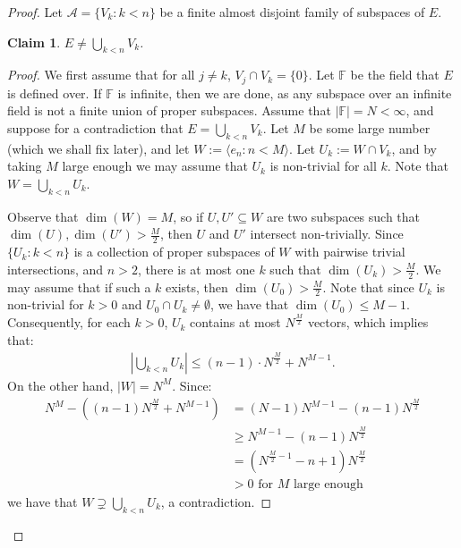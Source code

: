 \documentclass[10pt,a4paper]{amsart}
\theoremstyle{plain}
\numberwithin{equation}{section}
\newtheorem{claim}{Claim}
\theoremstyle{definition}
\renewcommand{\c}[1]{\langle #1 \rangle}
\renewcommand{\mod}[1]{\left| #1 \right|}
\newcommand{\cal}{\mathcal}
\newcommand{\A}{\cal{A}}
\newenvironment{midproof}[1][Proof]
  {\begin{proof}[#1]\renewcommand{\qedsymbol}{$\blacksquare$}}
  {\end{proof}}
\begin{document}
\begin{proof}
    Let $\A = \{V_k : k < n\}$ be a finite almost disjoint family of subspaces of $E$. 

    \begin{claim}
    \label{claim:E.not.union}
        $E \neq \bigcup_{k<n} V_k$.
    \end{claim}

    \begin{midproof}
        We first assume that for all $j \neq k$, $V_j \cap V_k = \{0\}$. Let $\mathbb{F}$ be the field that $E$ is defined over. If $\mathbb{F}$ is infinite, then we are done, as any subspace over an infinite field is not a finite union of proper subspaces. Assume that $|\mathbb{F}| = N < \infty$, and suppose for a contradiction that $E = \bigcup_{k<n} V_k$. Let $M$ be some large number (which we shall fix later), and let $W := \c{e_n : n < M}$. Let $U_k := W \cap V_k$, and by taking $M$ large enough we may assume that $U_k$ is non-trivial for all $k$. Note that $W = \bigcup_{k<n} U_k$.
        
        Observe that $\dim(W) = M$, so if $U,U' \subseteq W$ are two subspaces such that $\dim(U),\dim(U') > \frac{M}{2}$, then $U$ and $U'$ intersect non-trivially. Since $\{U_k : k < n\}$ is a collection of proper subspaces of $W$ with pairwise trivial intersections, and $n > 2$, there is at most one $k$ such that $\dim(U_k) > \frac{M}{2}$. We may assume that if such a $k$ exists, then $\dim(U_0) > \frac{M}{2}$. Note that since $U_k$ is non-trivial for $k > 0$ and $U_0 \cap U_k \neq \emptyset$, we have that $\dim(U_0) \leq M - 1$. Consequently, for each $k > 0$, $U_k$ contains at most $N^{\frac{M}{2}}$ vectors, which implies that:
        \begin{align*}
            \mod{\bigcup_{k<n} U_k} \leq (n -1) \cdot N^{\frac{M}{2}} + N^{M-1}.
        \end{align*}
        On the other hand, $|W| = N^M$. Since:
        \begin{align*}
            N^M - ((n - 1)N^{\frac{M}{2}} + N^{M-1}) &= (N - 1)N^{M-1} - (n - 1)N^{\frac{M}{2}} \\
            &\geq N^{M-1} - (n-1)N^\frac{M}{2} \\
            &= (N^{\frac{M}{2} - 1} - n + 1)N^\frac{M}{2} \\
            &> 0 \text{ for $M$ large enough}
        \end{align*}
        we have that $W \supsetneq \bigcup_{k<n} U_k$, a contradiction.


\end{midproof}
\end{proof}
\end{document}
